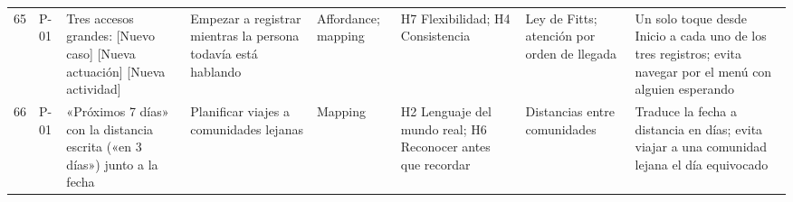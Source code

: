 \begin{longtable}{@{}p{0.6cm}p{1.5cm}p{3.6cm}p{3.4cm}p{2.2cm}p{2.8cm}p{2.3cm}p{4.6cm}@{}}
65 & P-01 & Tres accesos grandes: [Nuevo caso] [Nueva actuación] [Nueva actividad] & Empezar a registrar mientras la persona todavía está hablando & Affordance; mapping & H7 Flexibilidad; H4 Consistencia & Ley de Fitts; atención por orden de llegada & Un solo toque desde Inicio a cada uno de los tres registros; evita navegar por el menú con alguien esperando \\
66 & P-01 & «Próximos 7 días» con la distancia escrita («en 3 días») junto a la fecha & Planificar viajes a comunidades lejanas & Mapping & H2 Lenguaje del mundo real; H6 Reconocer antes que recordar & Distancias entre comunidades & Traduce la fecha a distancia en días; evita viajar a una comunidad lejana el día equivocado \\
\end{longtable}